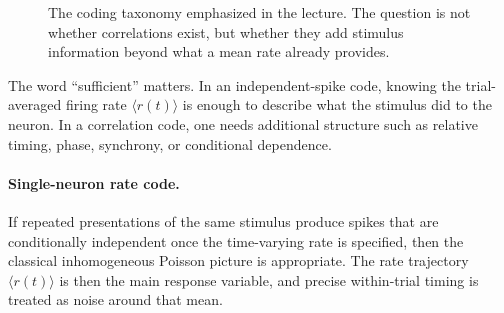 \begin{figure}[h]
\centering
{}
\caption{The coding taxonomy emphasized in the lecture. The question is not whether correlations exist, but whether they add stimulus information beyond what a mean rate already provides.}
\end{figure}

The word ``sufficient'' matters. In an independent-spike code, knowing the trial-averaged firing rate $\langle r(t)\rangle$ is enough to describe what the stimulus did to the neuron. In a correlation code, one needs additional structure such as relative timing, phase, synchrony, or conditional dependence.

\paragraph{Single-neuron rate code.}
If repeated presentations of the same stimulus produce spikes that are conditionally independent once the time-varying rate is specified, then the classical inhomogeneous Poisson picture is appropriate. The rate trajectory $\langle r(t)\rangle$ is then the main response variable, and precise within-trial timing is treated as noise around that mean.

